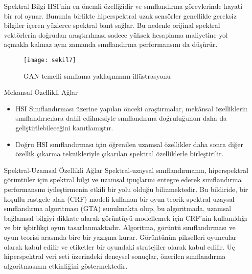 \documentclass{beamer}
\begin{document}
\begin{frame}{Spektral Bilgi}
  HSI’nin en önemli özelliğidir ve sınıflandırma görevlerinde hayati bir rol oynar. Bununla birlikte hiperspektral uzak sensörler genellikle gereksiz bilgiler içeren yüzlerce spektral bant sağlar. Bu nedenle orijinal spektral vektörlerin doğrudan araştırılması sadece yüksek hesaplama maliyetine yol açmakla kalmaz aynı zamanda sınıflandırma performansını da düşürür.
\end{frame}

\begin{frame}
  \begin{figure}[]
    \texttt{[image: sekil7]}
    \label{fig:sekil3}
    \caption{GAN temelli sınıflama yaklaşımının illüstrasyonu}
  \end{figure}
\end{frame}

\begin{frame}{Mekansal Özellikli Ağlar}
\begin{itemize}
  \item HSI Sınıflandırması üzerine yapılan önceki araştırmalar, mekânsal özelliklerin sınıflandırıcılara dahil edilmesiyle sınıflandırma doğruluğunun daha da geliştirilebileceğini kanıtlamıştır.
  \item Doğru HSI sınıflandırması için öğrenilen uzamsal özellikler daha sonra diğer özellik çıkarma teknikleriyle çıkarılan spektral özelliklerle birleştirilir.
\end{itemize}
\end{frame}

\begin{frame}{Spektral-Uzamsal Özellikli Ağlar }
  Spektral-uzaysal sınıflandırmanın, hiperspektral görüntüler için spektral bilgi ve uzamsal ipuçlarını entegre ederek sınıflandırma performansını iyileştirmenin etkili bir yolu olduğu bilinmektedir. Bu bildiride, bir koşullu rastgele alan (CRF) modeli kullanan bir oyun-teorik spektral-uzaysal sınıflandırma algoritması (GTA) sunulmakta olup, bu algoritmada, uzamsal bağlamsal bilgiyi dikkate alarak görüntüyü modellemek için CRF'nin kullanıldığı ve bir işbirlikçi oyun tasarlanmaktadır. Algoritma, görüntü sınıflandırması ve oyun teorisi arasında bire bir yazışma kurar. Görüntünün pikselleri oyuncular olarak kabul edilir ve etiketler bir oyundaki stratejiler olarak kabul edilir. Üç hiperspektral veri seti üzerindeki deneysel sonuçlar, önerilen sınıflandırma algoritmasının etkinliğini göstermektedir.
\end{frame}
\end{document}
